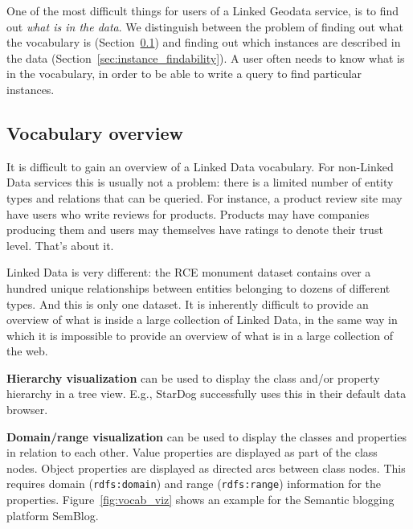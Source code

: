 \documentclass[a4paper]{scrartcl}
\newcommand{\textt}[1]{{\small \texttt{#1}}}
\begin{document}
One of the most difficult things for users of a Linked Geodata
service, is to find out \emph{what is in the data}.  We distinguish
between the problem of finding out what the vocabulary is
(Section~\ref{sec:vocabulary_overview}) and finding out which
instances are described in the data
(Section~\ref{sec:instance_findability}).  A user often needs to know
what is in the vocabulary, in order to be able to write a query to
find particular instances.


\subsection{Vocabulary overview}
\label{sec:vocabulary_overview}

It is difficult to gain an overview of a Linked Data vocabulary.  For
non-Linked Data services this is usually not a problem: there is a
limited number of entity types and relations that can be queried.  For
instance, a product review site may have users who write reviews for
products.  Products may have companies producing them and users may
themselves have ratings to denote their trust level.  That's about it.

Linked Data is very different: the RCE monument dataset contains over
a hundred unique relationships between entities belonging to dozens of
different types.  And this is only one dataset.  It is inherently
difficult to provide an overview of what is inside a large collection
of Linked Data, in the same way in which it is impossible to provide
an overview of what is in a large collection of the web.

\textbf{Hierarchy visualization} can be used to display the class
and/or property hierarchy in a tree view.  E.g., StarDog successfully
uses this in their default data browser.

\textbf{Domain/range visualization} can be used to display the classes
and properties in relation to each other.  Value properties are
displayed as part of the class nodes.  Object properties are displayed
as directed arcs between class nodes.  This requires domain
(\textt{rdfs:domain}) and range (\textt{rdfs:range}) information for
the properties.  Figure~\ref{fig:vocab_viz} shows an example for the
Semantic blogging platform SemBlog.
\end{document}
